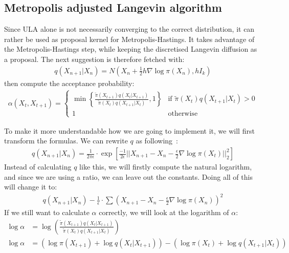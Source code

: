 \subsection{Metropolis adjusted Langevin algorithm}\label{sec:MALA}
Since ULA alone is not necessarily converging to the correct distribution, it can rather be used as proposal kernel for Metropolis-Hastings. It takes advantage of the Metropolis-Hastings step, while keeping the discretised Langevin diffusion as a proposal.
The next suggestion is therefore fetched with:
\begin{align}
q(X_{n+1} | X_n)=N(X_{n}+\frac{1}{2}h\nabla\log{\pi(X_{n})}, hI_k)
\end{align}
then compute the acceptance probability:
\begin{align}
    \alpha(X_t,X_{t+1}) = 
    \begin{cases}
        \min \left\{ \frac{\tilde{\pi}(X_{t+1}) q(X_t|X_{t+1} )}{\tilde{\pi}(X_t) q(X_{t+1}|X_t)}, 1 \right\} & \text{if } \tilde{\pi}(X_t)q(X_{t+1}|X_t)>0 \\
        1 & \text{otherwise}
    \end{cases}    
\end{align}

To make it more understandable how we are going to implement it, we will first transform the formulas. We can rewrite $q$ as following~\cite{RobertsRosenthal}: 
\begin{align}
q(X_{n+1} | X_n)=\frac{1}{2\pi\epsilon}\cdot \exp{\left[\frac{-1}{2\epsilon}\vert\vert X_{n+1}- X_n - \frac{\epsilon}{2}\nabla\log{\pi(X_t)}\vert\vert^2_2\right] }
\end{align}
Instead of calculating $q$ like this, we will firstly compute the natural logarithm, and since we are using a ratio, we can leave out the constants. Doing all of this will change it to:
\begin{align}
q(X_{n+1} | X_n)-\frac{1}{\epsilon}\cdot\sum(X_{n+1}-X_{n}-\frac{\epsilon}{2}\nabla\log{\pi(X_n)})^2
\end{align}
If we still want to calculate $\alpha$ correctly, we will look at the logarithm of $\alpha$:
\begin{align}
    \log{\alpha} &= \log\left(\frac{\tilde{\pi}(X_{t+1}) q(X_t|X_{t+1} )}{\tilde{\pi}(X_t) q(X_{t+1}|X_t)}\right) \\
    \log{\alpha} &= (\log{\pi{(X_{t+1})}} + \log{q(X_t | X_{t+1})}) - (\log{\pi{(X_t)}}+\log{q(X_{t+1} | X_t)}) 
\end{align}

